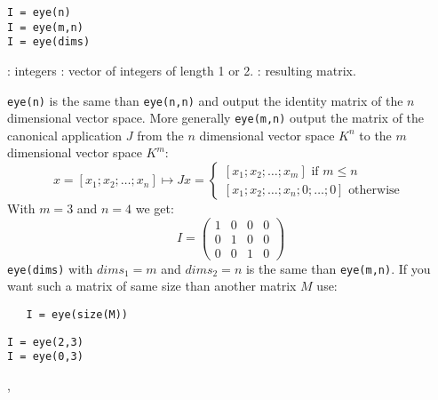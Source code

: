 \begin{mandesc}
\end{mandesc}
\begin{calling_sequence}
\begin{verbatim}
I = eye(n)
I = eye(m,n)
I = eye(dims)
\end{verbatim}
\end{calling_sequence}
\begin{parameters}
  \begin{varlist}
    : integers
    : vector of integers of length 1 or 2.
    : resulting matrix.
  \end{varlist}
\end{parameters}

\begin{mandescription}
\verb+eye(n)+ is the same than \verb+eye(n,n)+ and output the identity matrix of the $n$ dimensional
vector space. More generally \verb+eye(m,n)+ output the matrix of the canonical application $J$ from
the $n$ dimensional vector space $K^n$ to the  $m$ dimensional vector space $K^m$: 
$$
x = \left[ x_1 ; x_2 ; \dots ; x_n \right]  \longmapsto  J x = 
\left\{ 
\begin{array}{l} 
     \left[ x_1 ; x_2 ; \dots ; x_m \right] \mbox{ if } m \le n \\ \left[ x_1 ; x_2 ; \dots ; x_n ; 0 ; \dots ; 0 \right] \mbox{ otherwise }
\end{array} 
\right.
$$
With $m=3$ and $n=4$ we get:
$$
    I = \left( \begin{array}{cccc} 1 & 0 & 0 & 0 \\ 0 & 1 & 0 & 0 \\ 0 & 0 & 1 & 0
      \end{array} \right)
$$
\verb+eye(dims)+ with $dims_1 = m$ and $dims_2 = n$ is the same than  \verb+eye(m,n)+. If you want
such a matrix of same size than another matrix $M$ use: 
\begin{verbatim}
   I = eye(size(M))
\end{verbatim}

\end{mandescription}


\begin{examples}
\begin{Verbatim}
I = eye(2,3) 
I = eye(0,3)
\end{Verbatim} 

\end{examples}

\begin{manseealso}
, 
\end{manseealso}

